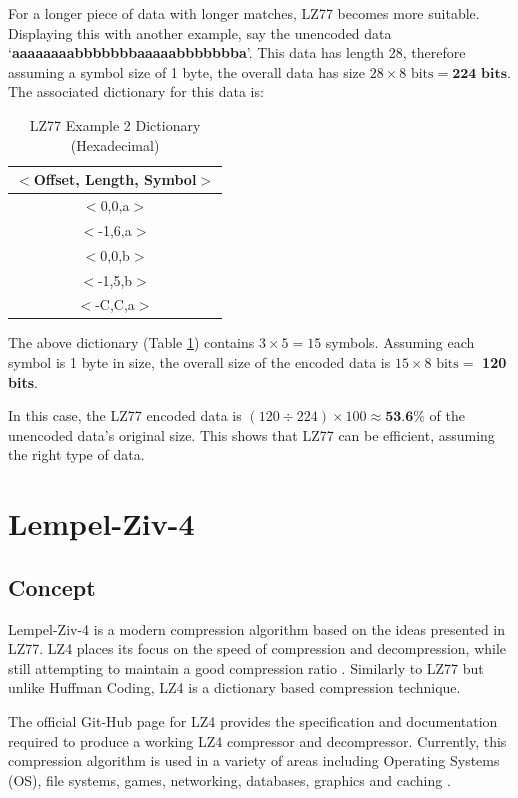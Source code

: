 \documentclass[12pt]{article}
\begin{document}
For a longer piece of data with longer matches, LZ77 becomes more suitable. Displaying this with another example, say the unencoded data `\textbf{aaaaaaaabbbbbbbaaaaabbbbbbba}'. This data has length 28, therefore assuming a symbol size of 1 byte, the overall data has size $28 \times 8 \text{ bits}=\textbf{224 bits}$. The associated dictionary for this data is:

\begin{table}[H]
	\centering
	\begin{tabular}{| c |} 
		\hline
		$<$Offset, Length, Symbol$>$\\
		\hline
		$<$0,0,a$>$\\
		$<$-1,6,a$>$\\
		$<$0,0,b$>$\\
		$<$-1,5,b$>$\\
		$<$-C,C,a$>$\\
		\hline
	\end{tabular}
	\caption{LZ77 Example 2 Dictionary (Hexadecimal)}
	\label{dic_ex2}
\end{table}

The above dictionary (Table \ref{dic_ex2}) contains $3 \times 5 = 15$ symbols. Assuming each symbol is 1 byte in size, the overall size of the encoded data is $15 \times 8 \text{ bits} =$ \textbf{120 bits}.

In this case, the LZ77 encoded data is $(120\div224)\times100\approx\textbf{53.6\%}$ of the unencoded data's original size. This shows that LZ77 can be efficient, assuming the right type of data.

\clearpage
\section{Lempel-Ziv-4}
\subsection{Concept}	
Lempel-Ziv-4 is a modern compression algorithm based on the ideas presented in LZ77. LZ4 places its focus on the speed of compression and decompression, while still attempting to maintain a good compression ratio \citep{lz4_fpga}. Similarly to LZ77 but unlike Huffman Coding, LZ4 is a dictionary based compression technique.

The official Git-Hub page for LZ4 provides the specification and documentation required to produce a working LZ4 compressor and decompressor. Currently, this compression algorithm is used in a variety of areas including Operating Systems (OS), file systems, games, networking, databases, graphics and caching \citep{lz4_github}.
\end{document}
